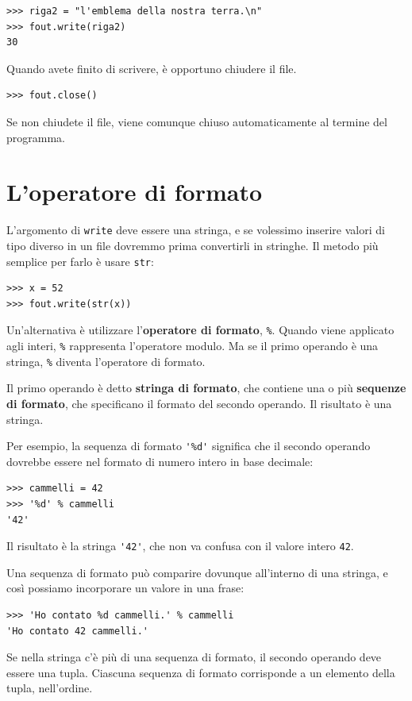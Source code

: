 \documentclass[10pt]{book}
\begin{document}
\begin{verbatim}
>>> riga2 = "l'emblema della nostra terra.\n"
>>> fout.write(riga2)
30
\end{verbatim}
%
Quando avete finito di scrivere, è opportuno chiudere il file.

\begin{verbatim}
>>> fout.close()
\end{verbatim}
%

Se non chiudete il file, viene comunque chiuso automaticamente al termine del programma.

\section{L'operatore di formato}

L'argomento di {\tt write} deve essere una stringa, e se volessimo inserire valori di tipo diverso in un file dovremmo prima convertirli in stringhe. Il metodo più semplice per farlo è usare {\tt str}:

\begin{verbatim}
>>> x = 52
>>> fout.write(str(x))
\end{verbatim}
%
Un'alternativa è utilizzare l'{\bf operatore di formato}, {\tt \%}.  Quando viene applicato agli interi, {\tt \%} rappresenta l'operatore modulo.  Ma se il primo operando è una stringa, {\tt \%} diventa l'operatore di formato.

Il primo operando è detto {\bf stringa di formato}, che contiene una o più {\bf sequenze di formato}, che specificano il formato del secondo operando. Il risultato è una stringa.

Per esempio, la sequenza di formato \verb"'%d'" significa che il secondo operando dovrebbe essere nel formato di numero intero in base decimale:

\begin{verbatim}
>>> cammelli = 42
>>> '%d' % cammelli
'42'
\end{verbatim}
%
Il risultato è la stringa \verb"'42'", che non va confusa con il valore intero {\tt 42}.

Una sequenza di formato può comparire dovunque all'interno di una
   stringa, e così possiamo incorporare un valore in una frase:

\begin{verbatim}
>>> 'Ho contato %d cammelli.' % cammelli
'Ho contato 42 cammelli.'
\end{verbatim}
%
Se nella stringa c'è più di una sequenza di formato, il secondo operando deve essere una tupla. Ciascuna sequenza di formato corrisponde a un elemento della tupla, nell'ordine.
\end{document}
